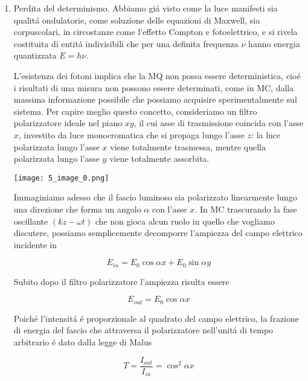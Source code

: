 \documentclass[a4paper]{article}
\numberwithin{equation}{section}
\begin{document}
\begin{enumerate}
\item Perdita del determinismo. Abbiamo gi\'a visto come la luce manifesti sia qualit\'a ondulatorie, come soluzione delle equazioni di Maxwell, sia corpuscolari, in circostanze come l'effetto Compton e fotoelettrico, e si rivela costituita di entit\'a indivisibili che per una definita frequenza $\nu$ hanno energia quantizzata $E = h\nu$.

L'esistenza dei fotoni implica che la MQ non possa essere deterministica, cio\'e i risultati di una misura non possono essere determinati, come in MC, dalla massima informazione possibile che possiamo acquisire sperimentalmente sul sistema. Per capire meglio questo concetto, consideriamo un filtro polarizzatore ideale nel piano $xy$, il cui asse di trasmissione coincida con l'asse $x$, investito da luce monocromatica che si propaga lungo l'asse $z$: la luce polarizzata lungo l'asse $x$ viene totalmente trasmessa, mentre quella polarizzata lungo l'asse $y$ viene totalmente assorbita.

\begin{center}
	\texttt{[image: 5\_image\_0.png]}
\end{center}

Immaginiamo adesso che il fascio luminoso sia polarizzato linearmente lungo una direzione che forma un angolo $\alpha$ con l'asse $x$. In MC trascurando la fase oscillante $(kz - \omega t)$ che non gioca alcun ruolo in quello che vogliamo discutere, possiamo semplicemente decomporre l'ampiezza del campo elettrico incidente in

$$E_{i n}=E_{0}\cos\alpha x+E_{0}\sin\alpha y$$

Subito dopo il filtro polarizzatore l'ampiezza risulta essere

$$E_{o u t}=E_{0}\cos\alpha x$$

Poich\'e l'intensit\'a \'e proporzionale al quadrato del campo elettrico, la frazione di energia del fascio che attraversa il polarizzatore nell'unit\'a di tempo arbitrario \'e dato dalla legge di Malus

$$T={\frac{I_{o u t}}{I_{i n}}}=\cos^{2}\alpha x$$


\end{enumerate}
\end{document}
